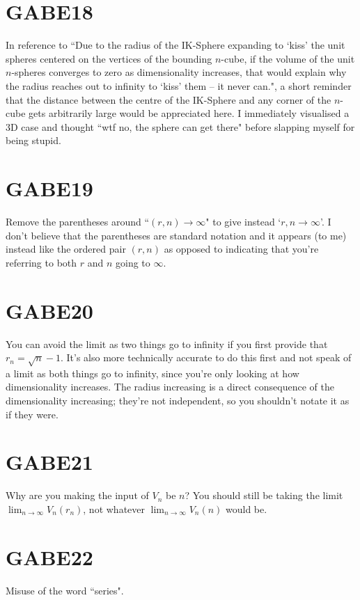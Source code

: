\section{GABE18}
In reference to ``Due to the radius of the IK-Sphere expanding to `kiss' the unit spheres centered on the vertices of the bounding $n$-cube, if the volume of the unit $n$-spheres converges to zero as dimensionality increases, that would explain why the radius reaches out to infinity to `kiss' them -- it never can.", a short reminder that the distance between the centre of the IK-Sphere and any corner of the $n$-cube gets arbitrarily large would be appreciated here. I immediately visualised a 3D case and thought ``wtf no, the sphere can get there" before slapping myself for being stupid.

\section{GABE19}
Remove the parentheses around ``$(r,n)\to\infty$" to give instead `$r,n\to\infty$'. I don't believe that the parentheses are standard notation and it appears (to me) instead like the ordered pair $(r,n)$ as opposed to indicating that you're referring to both $r$ and $n$ going to $\infty$.

\section{GABE20}
You can avoid the limit as two things go to infinity if you first provide that $r_n = \sqrt{n} -1$. It's also more technically accurate to do this first and not speak of a limit as both things go to infinity, since you're only looking at how dimensionality increases. The radius increasing is a direct consequence of the dimensionality increasing; they're not independent, so you shouldn't notate it as if they were.

\section{GABE21}
Why are you making the input of $V_n$ be $n$? You should still be taking the limit $\lim_{n\to\infty} V_n \left(r_n \right)$, not whatever $\lim_{n\to\infty} V_n \left(n \right)$ would be.

\section{GABE22}
Misuse of the word ``series".

